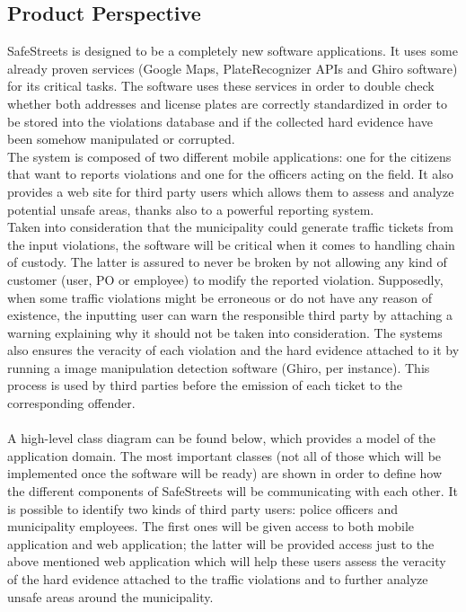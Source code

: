 \documentclass{article}
\begin{document}
\subsection{Product Perspective}
SafeStreets is designed to be a completely new software applications. It uses
some already proven services (Google Maps, PlateRecognizer APIs and Ghiro
software) for its critical tasks. The software uses these services in order to
double check whether both addresses and license plates are correctly
standardized in order to be stored into the violations database and if the
collected hard evidence have been somehow manipulated or corrupted.\\
The system is composed of two different mobile applications: one for the
citizens that want to reports violations and one for the officers acting on the
field. It also provides a web site for third party users which allows them to
assess and analyze potential unsafe areas, thanks also to a powerful reporting
system.\\
Taken into consideration that the municipality could generate traffic tickets
from the input violations, the software will be critical when it comes to
handling chain of custody. The latter is assured to never be broken by not
allowing any kind of customer (user, PO or employee) to modify the reported violation. Supposedly, when
some traffic violations might be erroneous or do not have any reason of
existence, the inputting user can warn the responsible third party by attaching
a warning explaining why it should not be taken into consideration. The systems
also ensures the veracity of each violation and the hard evidence attached to it
by running a image manipulation detection software (Ghiro, per instance). This process is used by
third parties before the emission of each ticket to the corresponding offender.\\
\\
A high-level class diagram can be found below, which provides a model of the
application domain. The most important classes (not all of those which will be
implemented once the software will be ready) are shown in order to define how
the different components of SafeStreets will be communicating with each other.
It is possible to identify two kinds of third party users: police officers and
municipality employees. The first ones will be given access to both mobile
application and web application; the latter will be provided access just to the
above mentioned web application which will help these users assess the veracity of the hard
evidence attached to the traffic violations and to further analyze unsafe areas
around the municipality.\\
\end{document}
